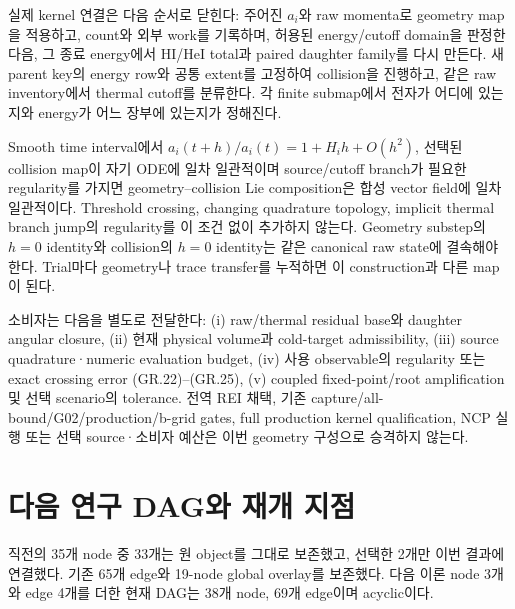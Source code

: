 \documentclass[11pt,a4paper]{article}
\begin{document}
실제 kernel 연결은 다음 순서로 닫힌다: 주어진 \(a_i\)와 raw momenta로 geometry map을 적용하고, count와 외부 work를 기록하며, 허용된 energy/cutoff domain을 판정한 다음, 그 종료 energy에서 HI/HeI total과 paired daughter family를 다시 만든다. 새 parent key의 energy row와 공통 extent를 고정하여 collision을 진행하고, 같은 raw inventory에서 thermal cutoff를 분류한다. 각 finite submap에서 전자가 어디에 있는지와 energy가 어느 장부에 있는지가 정해진다.

Smooth time interval에서 \(a_i(t+h)/a_i(t)=1+H_ih+O(h^2)\), 선택된 collision map이 자기 ODE에 일차 일관적이며 source/cutoff branch가 필요한 regularity를 가지면 geometry--collision Lie composition은 합성 vector field에 일차 일관적이다. Threshold crossing, changing quadrature topology, implicit thermal branch jump의 regularity를 이 조건 없이 추가하지 않는다. Geometry substep의 \(h=0\) identity와 collision의 \(h=0\) identity는 같은 canonical raw state에 결속해야 한다. Trial마다 geometry나 trace transfer를 누적하면 이 construction과 다른 map이 된다.

소비자는 다음을 별도로 전달한다: (i) raw/thermal residual base와 daughter angular closure, (ii) 현재 physical volume과 cold-target admissibility, (iii) source quadrature·numeric evaluation budget, (iv) 사용 observable의 regularity 또는 exact crossing error (GR.22)--(GR.25), (v) coupled fixed-point/root amplification 및 선택 scenario의 tolerance. 전역 REI 채택, 기존 capture/all-bound/G02/production/b-grid gates, full production kernel qualification, NCP 실행 또는 선택 source·소비자 예산은 이번 geometry 구성으로 승격하지 않는다.

\clearpage

\hypertarget{uxb2e4uxc74c-uxc5f0uxad6c-daguxc640-uxc7acuxac1c-uxc9c0uxc810}{%
\section{다음 연구 DAG와 재개 지점}\label{uxb2e4uxc74c-uxc5f0uxad6c-daguxc640-uxc7acuxac1c-uxc9c0uxc810}}

직전의 35개 node 중 33개는 원 object를 그대로 보존했고, 선택한 2개만 이번 결과에 연결했다. 기존 65개 edge와 19-node global overlay를 보존했다. 다음 이론 node 3개와 edge 4개를 더한 현재 DAG는 38개 node, 69개 edge이며 acyclic이다.
\end{document}
